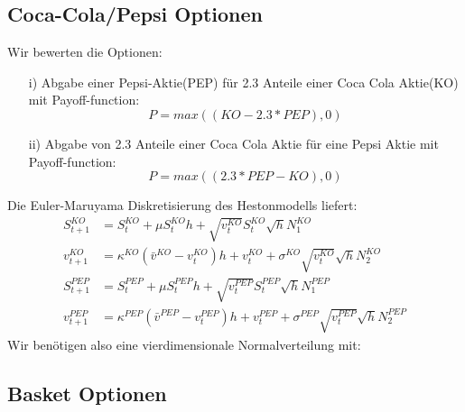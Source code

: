 \documentclass[a4paper,12pt]{article}
\numberwithin[\arabic]{Satz}{section}
\begin{document}
	\subsection*{Coca-Cola/Pepsi Optionen}
		Wir bewerten die Optionen: 
		\begin{itemize}
			\item[i)] Abgabe einer Pepsi-Aktie(PEP) für 2.3 Anteile einer Coca Cola Aktie(KO) mit Payoff-function:
				\begin{equation*}
				P=max((KO-2.3*PEP),0)
				\end{equation*}			
			\item[ii)] Abgabe von 2.3 Anteile einer Coca Cola Aktie für eine Pepsi Aktie mit Payoff-function:
			\begin{equation*}
			P=max((2.3*PEP-KO),0)
			\end{equation*}			
		\end{itemize}
		Die Euler-Maruyama Diskretisierung des Hestonmodells liefert:
		\begin{align*}
		S^{KO}_{t+1}&=S^{KO}_{t}+\mu S^{KO}_{t}h+\sqrt{v^{KO}_t}S^{KO}_{t}\sqrt{h}N^{KO}_1\\
		v^{KO}_{t+1}&=\kappa^{KO}(\bar{v}^{KO}-v^{KO}_t)h+v^{KO}_t+\sigma^{KO}\sqrt{v^{KO}_t}\sqrt{h}N^{KO}_2\\
		S^{PEP}_{t+1}&=S^{PEP}_{t}+\mu S^{PEP}_{t}h+\sqrt{v^{PEP}_t}S^{PEP}_{t}\sqrt{h}N^{PEP}_1\\
		v^{PEP}_{t+1}&=\kappa^{PEP}(\bar{v}^{PEP}-v^{PEP}_t)h+v^{PEP}_t+\sigma^{PEP}\sqrt{v^{PEP}_t}\sqrt{h}N^{PEP}_2
		\end{align*}
		Wir benötigen also eine vierdimensionale Normalverteilung mit:
		

		
	\subsection*{Basket Optionen}		
\end{document}
